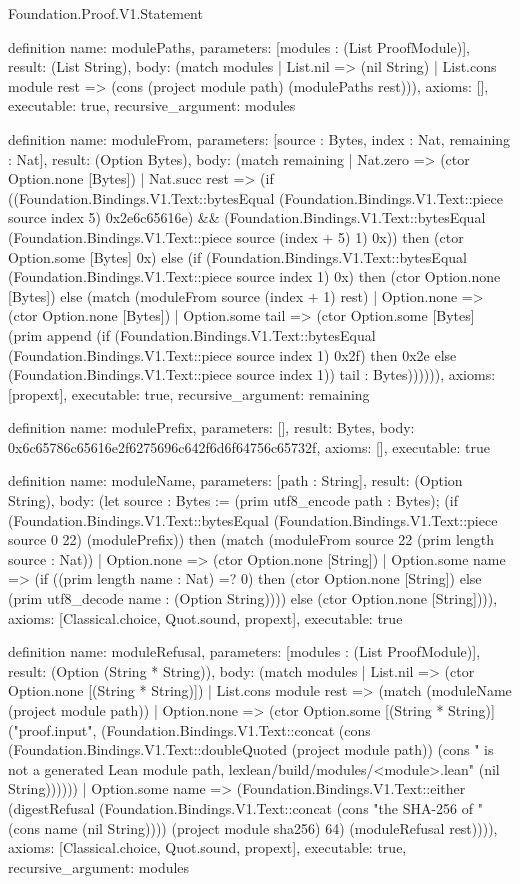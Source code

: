 \begin{lexlean}{Foundation.Proof.V1.Statement}
\begin{semanticmodule}
definition{
  name: modulePaths,
  parameters: [modules : (List ProofModule)],
  result: (List String),
  body: (match modules
    | List.nil => (nil String)
    | List.cons module rest => (cons (project module path) (modulePaths rest))),
  axioms: [],
  executable: true,
  recursive_argument: modules
}

definition{
  name: moduleFrom,
  parameters: [source : Bytes, index : Nat, remaining : Nat],
  result: (Option Bytes),
  body: (match remaining
    | Nat.zero => (ctor Option.none [Bytes])
    | Nat.succ rest => (if ((Foundation.Bindings.V1.Text::bytesEqual (Foundation.Bindings.V1.Text::piece source index 5) 0x2e6c65616e) && (Foundation.Bindings.V1.Text::bytesEqual (Foundation.Bindings.V1.Text::piece source (index + 5) 1) 0x)) then (ctor Option.some [Bytes] 0x) else (if (Foundation.Bindings.V1.Text::bytesEqual (Foundation.Bindings.V1.Text::piece source index 1) 0x) then (ctor Option.none [Bytes]) else (match (moduleFrom source (index + 1) rest)
      | Option.none => (ctor Option.none [Bytes])
      | Option.some tail => (ctor Option.some [Bytes] (prim append (if (Foundation.Bindings.V1.Text::bytesEqual (Foundation.Bindings.V1.Text::piece source index 1) 0x2f) then 0x2e else (Foundation.Bindings.V1.Text::piece source index 1)) tail : Bytes)))))),
  axioms: [propext],
  executable: true,
  recursive_argument: remaining
}

definition{
  name: modulePrefix,
  parameters: [],
  result: Bytes,
  body: 0x6c65786c65616e2f6275696c642f6d6f64756c65732f,
  axioms: [],
  executable: true
}

definition{
  name: moduleName,
  parameters: [path : String],
  result: (Option String),
  body: (let source : Bytes := (prim utf8_encode path : Bytes); (if (Foundation.Bindings.V1.Text::bytesEqual (Foundation.Bindings.V1.Text::piece source 0 22) (modulePrefix)) then (match (moduleFrom source 22 (prim length source : Nat))
    | Option.none => (ctor Option.none [String])
    | Option.some name => (if ((prim length name : Nat) =? 0) then (ctor Option.none [String]) else (prim utf8_decode name : (Option String)))) else (ctor Option.none [String]))),
  axioms: [Classical.choice, Quot.sound, propext],
  executable: true
}

definition{
  name: moduleRefusal,
  parameters: [modules : (List ProofModule)],
  result: (Option (String * String)),
  body: (match modules
    | List.nil => (ctor Option.none [(String * String)])
    | List.cons module rest => (match (moduleName (project module path))
      | Option.none => (ctor Option.some [(String * String)] ("proof.input", (Foundation.Bindings.V1.Text::concat (cons (Foundation.Bindings.V1.Text::doubleQuoted (project module path)) (cons " is not a generated Lean module path, lexlean/build/modules/<module>.lean" (nil String))))))
      | Option.some name => (Foundation.Bindings.V1.Text::either (digestRefusal (Foundation.Bindings.V1.Text::concat (cons "the SHA-256 of " (cons name (nil String)))) (project module sha256) 64) (moduleRefusal rest)))),
  axioms: [Classical.choice, Quot.sound, propext],
  executable: true,
  recursive_argument: modules
}


\end{semanticmodule}
\end{lexlean}
